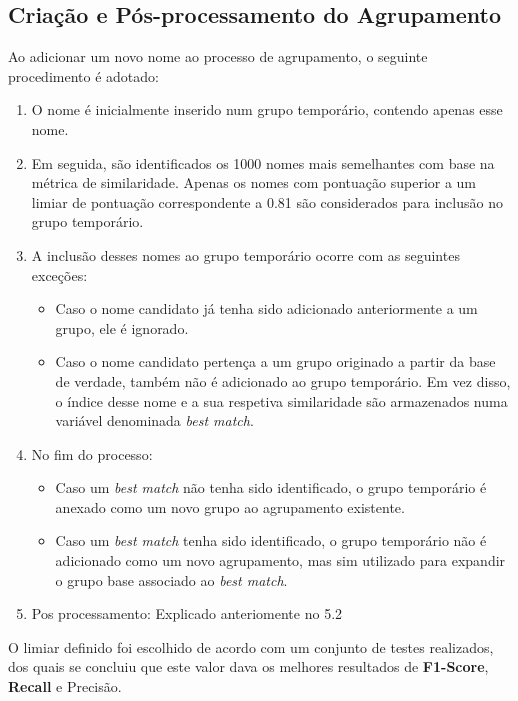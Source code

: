 \documentclass[a4paper,12pt]{article}
\begin{document}
\subsection{Criação e Pós-processamento do Agrupamento}

Ao adicionar um novo nome ao processo de agrupamento, o seguinte procedimento é adotado:

\begin{enumerate}
    \item O nome é inicialmente inserido num grupo temporário, contendo apenas esse nome.
    
    \item Em seguida, são identificados os 1000 nomes mais semelhantes com base na métrica de similaridade. Apenas os nomes com pontuação superior a um limiar de pontuação correspondente a 0.81 são considerados para inclusão no grupo temporário.
    
    \item A inclusão desses nomes ao grupo temporário ocorre com as seguintes exceções:
    \begin{itemize}
        \item Caso o nome candidato já tenha sido adicionado anteriormente a um grupo, ele é ignorado.
        \item Caso o nome candidato pertença a um grupo originado a partir da base de verdade, também não é adicionado ao grupo temporário. Em vez disso, o índice desse nome e a sua respetiva similaridade são armazenados numa variável denominada \textit{best match}.
    \end{itemize}
    
    \item No fim do processo:
    \begin{itemize}
        \item Caso um \textit{best match} não tenha sido identificado, o grupo temporário é anexado como um novo grupo ao agrupamento existente.
        \item Caso um \textit{best match} tenha sido identificado, o grupo temporário não é adicionado como um novo agrupamento, mas sim utilizado para expandir o grupo base associado ao \textit{best match}.
    \end{itemize}
    \item Pos processamento: Explicado anteriomente no 5.2
\end{enumerate}
O limiar definido foi escolhido de acordo com um conjunto de testes realizados, dos quais se concluiu que este valor dava os melhores resultados de \textbf{F1-Score}, \textbf{Recall} e Precisão.
\end{document}
